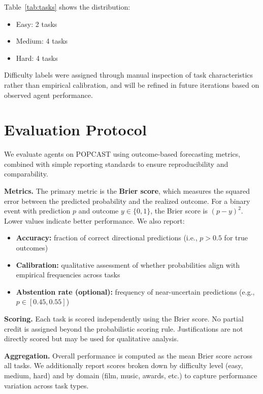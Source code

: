 \documentclass{article} %
\newcommand{\benchmarkname}{POPCAST}
\begin{document}
Table~\ref{tab:tasks} shows the distribution:
\begin{itemize}[noitemsep]
    \item Easy: 2 tasks
    \item Medium: 4 tasks
    \item Hard: 4 tasks
\end{itemize}

Difficulty labels were assigned through manual inspection of task characteristics rather than empirical calibration, and will be refined in future iterations based on observed agent performance.

\section{Evaluation Protocol}
\label{sec:eval}

We evaluate agents on \benchmarkname{} using outcome-based forecasting metrics, combined with simple reporting standards to ensure reproducibility and comparability.

\textbf{Metrics.} The primary metric is the \textbf{Brier score}, which measures the squared error between the predicted probability and the realized outcome. For a binary event with prediction $p$ and outcome $y \in \{0,1\}$, the Brier score is $(p - y)^2$. Lower values indicate better performance. We also report:
\begin{itemize}[noitemsep]
    \item \textbf{Accuracy:} fraction of correct directional predictions (i.e., $p > 0.5$ for true outcomes)
    \item \textbf{Calibration:} qualitative assessment of whether probabilities align with empirical frequencies across tasks
    \item \textbf{Abstention rate (optional):} frequency of near-uncertain predictions (e.g., $p \in [0.45, 0.55]$)
\end{itemize}

\textbf{Scoring.} Each task is scored independently using the Brier score. No partial credit is assigned beyond the probabilistic scoring rule. Justifications are not directly scored but may be used for qualitative analysis.

\textbf{Aggregation.} Overall performance is computed as the mean Brier score across all tasks. We additionally report scores broken down by difficulty level (easy, medium, hard) and by domain (film, music, awards, etc.) to capture performance variation across task types.
\end{document}
